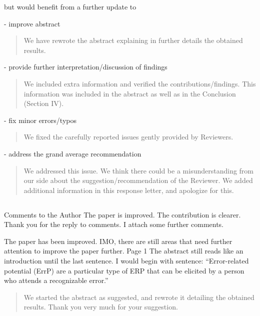 \documentclass[journal,onecolumn,12pt]{IEEEtran}
\begin{document}
but would benefit from a further update to 

- improve abstract

\begin{quotation}
{\color{blue}
We have rewrote the abstract explaining in further details the obtained results.  
}
\end{quotation}

- provide further interpretation/discussion of findings

\begin{quotation}
{\color{blue}
We included extra information and verified the contributions/findings.  This information was included in the abstract as well as in the Conclusion (Section IV).
}
\end{quotation}

- fix minor errors/typos

\begin{quotation}
{\color{blue}
We fixed the carefully reported issues gently provided by Reviewers.
}
\end{quotation}

- address the grand average recommendation

\begin{quotation}
{\color{blue}
We addressed this issue.  We think there could be a misunderstanding from our side about the suggestion/recommendation of the Reviewer.  We added additional information in this response letter, and apologize for this.
}
\end{quotation}

\subsection*{}

Comments to the Author
The paper is improved. The contribution is clearer. Thank you for the reply to comments. I attach some further comments.

The paper has been improved. IMO, there are still areas that need further attention to improve the paper further.
Page 1
The abstract still reads like an introduction until the last sentence.  I would begin with sentence: “Error-related potential (ErrP) are a particular type of ERP that can be elicited by a person who attends a recognizable error.”

\begin{quotation}
{\color{blue}
We started the abstract as suggested, and rewrote it detailing the obtained results.   Thank you very much for your suggestion.
}
\end{quotation}
\end{document}
